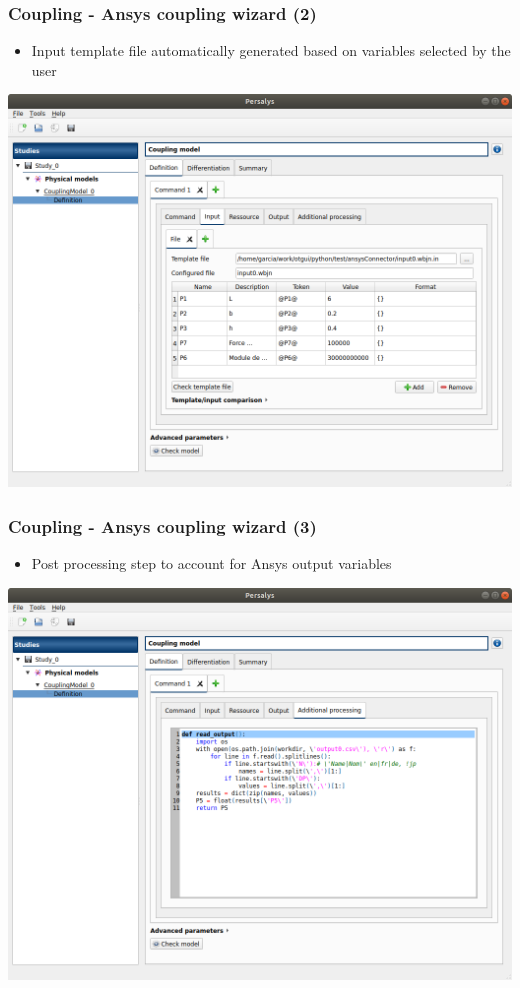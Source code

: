 \documentclass[aspectratio=169]{beamer}
\begin{document}

\begin{frame}
\frametitle{Coupling - Ansys coupling wizard (2)}
  \begin{itemize}
  \item Input template file automatically generated based on variables selected by the user
  \end{itemize}
  \begin{center}
    \includegraphics[height=0.6\textheight]{figures/ansys3.png}
  \end{center}
\end{frame}


\begin{frame}
  \frametitle{Coupling - Ansys coupling wizard (3)}
  \begin{itemize}
  \item Post processing step to account for Ansys output variables
  \end{itemize}
  \begin{center}
    \includegraphics[height=0.6\textheight]{figures/ansys4.png}
  \end{center}
\end{frame}
\end{document}
